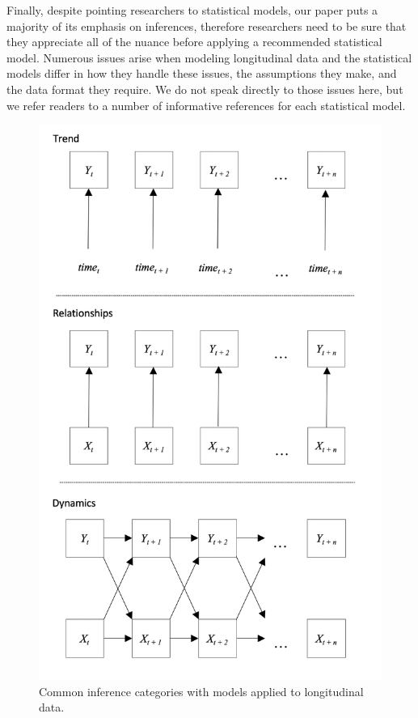 \documentclass[english,,man]{apa6}
\begin{document}
Finally, despite pointing researchers to statistical models, our paper puts a majority of its emphasis on inferences, therefore researchers need to be sure that they appreciate all of the nuance before applying a recommended statistical model. Numerous issues arise when modeling longitudinal data and the statistical models differ in how they handle these issues, the assumptions they make, and the data format they require. We do not speak directly to those issues here, but we refer readers to a number of informative references for each statistical model.

\begin{figure}

{\centering \includegraphics[width=4.66in]{figures/dynamics/framework} 

}

\caption{Common inference categories with models applied to longitudinal data.\label{framework_figure}}\label{fig:unnamed-chunk-6}
\end{figure}
\end{document}

